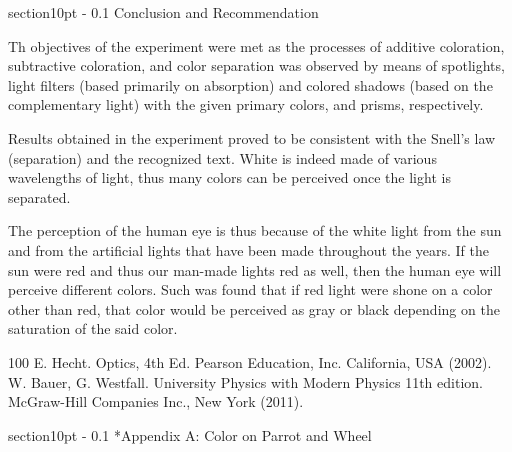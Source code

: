 \documentclass[twoside]{article}
\makeatletter
\renewcommand\section{\@startsection
   {section}{1}{0pt}%
   {-\baselineskip}%
   {0.1\baselineskip}%
   {\normalfont\large\bfseries}}%
\makeatother
\begin{document}
\section{Conclusion and Recommendation}
\label{sec:conclusion}

Th objectives of the experiment were met as the processes of additive coloration, subtractive coloration, and color separation was observed by means of spotlights, light filters (based primarily on absorption) and colored shadows (based on the complementary light) with the given primary colors, and prisms, respectively.

Results obtained in the experiment proved to be consistent with the Snell's law (separation) and the recognized text. White is indeed made of various wavelengths of light, thus many colors can be perceived once the light is separated.

The perception of the human eye is thus because of the white light from the sun and from the artificial lights that have been made throughout the years. If the sun were red and thus our man-made lights red as well, then the human eye will perceive different colors. Such was found that if red light were shone on a color other than red, that color would be perceived as gray or black depending on the saturation of the said color.


\newpage

\begin{thebibliography}{100}
E. Hecht. Optics, 4th Ed. Pearson Education, Inc. California, USA (2002).
W. Bauer, G. Westfall. University Physics with Modern Physics 11th edition. McGraw-Hill Companies Inc., New York (2011).

\end{thebibliography}

\newpage
\section*{Appendix A: Color on Parrot and Wheel}
\label{sec:appendixA}
\end{document}
